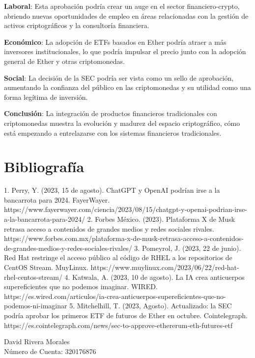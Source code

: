 \documentclass{article}
\begin{document}
\textbf{Laboral}: Esta aprobación podría crear un auge en el sector financiero-crypto, abriendo nuevas oportunidades de empleo en áreas relacionadas con la gestión de activos criptográficos y la consultoría financiera.

\textbf{Económico}: La adopción de ETFs basados en Ether podría atraer a más inversores institucionales, lo que podría impulsar el precio junto con la adopción general de Ether y otras criptomonedas.

\textbf{Social}: La decisión de la SEC podría ser vista como un sello de aprobación, aumentando la confianza del público en las criptomonedas y su utilidad como una forma legítima de inversión.

\textbf{Conclusión}: La integración de productos financieros tradicionales con criptomonedas muestra la evolución y madurez del espacio criptográfico, cómo está empezando a entrelazarse con los sistemas financieros tradicionales.

\section*{Bibliografía}

1. Perry, Y. (2023, 15 de agosto). ChatGPT y OpenAI podrían irse a la bancarrota para 2024. FayerWayer. https://www.fayerwayer.com/ciencia/2023/08/15/chatgpt-y-openai-podrian-irse-a-la-bancarrota-para-2024/
2. Forbes México. (2023). Plataforma X de Musk retrasa acceso a contenidos de grandes medios y redes sociales rivales. https://www.forbes.com.mx/plataforma-x-de-musk-retrasa-acceso-a-contenidos-de-grandes-medios-y-redes-sociales-rivales/
3. Pomeyrol, J. (2023, 22 de junio). Red Hat restringe el acceso público al código de RHEL a los repositorios de CentOS Stream. MuyLinux. https://www.muylinux.com/2023/06/22/red-hat-rhel-centos-stream/
4. Katwala, A. (2023, 10 de agosto). La IA crea anticuerpos supereficientes que no podemos imaginar. WIRED. https://es.wired.com/articulos/ia-crea-anticuerpos-supereficientes-que-no-podemos-ni-imaginar
5. Mitchelhill, T. (2023, Agosto). Actualizado: la SEC podría aprobar los primeros ETF de futuros de Ether en octubre. Cointelegraph. https://es.cointelegraph.com/news/sec-to-approve-ethererum-eth-futures-etf

\vspace{1cm}
\noindent
David Rivera Morales \\
Número de Cuenta: 320176876
\end{document}
